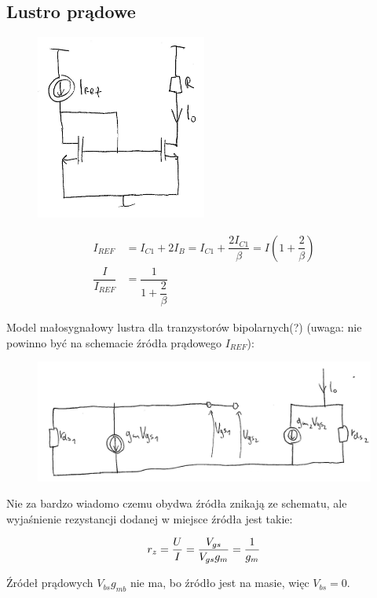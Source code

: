 \documentclass[10pt,a4paper]{article}
\begin{document}
\subsection{Lustro prądowe}
\begin{figure}[H]
\centering
\includegraphics[width=0.5\textwidth]{lustro}
\end{figure}
\begin{align*}
I_{REF}&=I_{C1}+2I_B=I_{C1}+\dfrac{2I_{C1}}{\beta}=I(1+\dfrac{2}{\beta}) \\
\dfrac{I}{I_{REF}}&=\dfrac{1}{1+\dfrac{2}{\beta}}
\end{align*}

Model małosygnałowy lustra dla tranzystorów bipolarnych(?) (uwaga: nie powinno być na schemacie źródła prądowego $I_{REF}$):
\begin{figure}[H]
\centering
\includegraphics[scale=0.8]{lustr_wyp1}
\end{figure}

Nie za bardzo wiadomo czemu obydwa źródła znikają ze schematu, ale wyjaśnienie rezystancji dodanej w miejsce źródła jest takie:

\begin{equation}
r_z = {U \over I} = {V_{gs} \over V_{gs}g_m} = {1 \over g_m}
\end{equation}

Źródeł prądowych $V_{bs}g_{mb}$ nie ma, bo źródło jest na masie, więc $V_{bs} = 0$.
\end{document}
